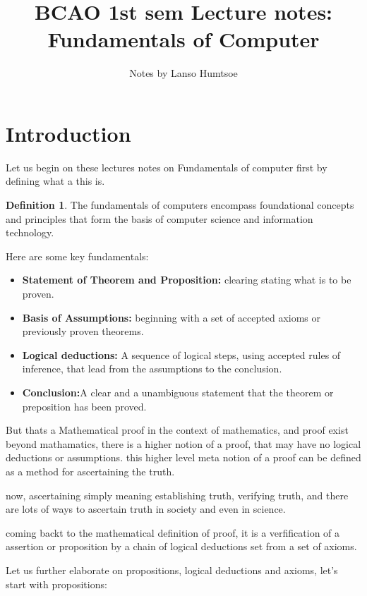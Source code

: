 \documentclass{article}
\theoremstyle{definition}
\newtheorem{definition}{Definition}
\begin{document}
\title{BCAO 1st sem Lecture notes: Fundamentals of Computer }
\author{Notes by Lanso Humtsoe}
\maketitle
\section{Introduction}

Let us begin on these lectures notes on Fundamentals of computer first by defining what a this is. 

\begin{definition}
The fundamentals of computers encompass foundational concepts and principles that form the basis of computer science and information technology.
\end{definition}
 Here are some key fundamentals:

\begin{itemize}
  \item \textbf{Statement of Theorem and Proposition:} clearing stating what is to be proven.
  \item \textbf{Basis of Assumptions:} beginning with a set of accepted axioms or previously proven theorems. 
  \item \textbf{Logical deductions:} A sequence of logical steps, using accepted rules of inference, that lead from the assumptions to the conclusion.
  \item \textbf{Conclusion:}A clear and a unambiguous statement that the theorem or preposition has been proved.
\end{itemize}

But thats a Mathematical proof in the context of mathematics, and proof exist beyond mathamatics, there is a higher notion of a proof, that may have no logical deductions or assumptions.
this higher level meta notion of a proof can be defined as a method for ascertaining the truth.

now, ascertaining simply meaning establishing truth, verifying truth, and there are lots of ways to ascertain truth in society and even in science.

coming backt to the mathematical definition of proof, it is a verfification of a assertion or proposition by a chain of logical deductions set from a set of axioms. 


Let us further elaborate on propositions, logical deductions and axioms, let's start with propositions:
\end{document}
